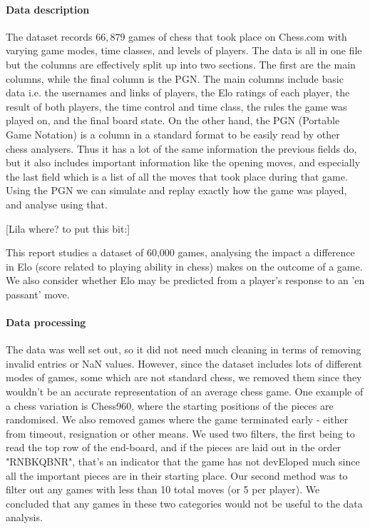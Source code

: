 \documentclass[10pt,a4paper,twocolumn]{article}
\begin{document}
\paragraph{Data description}
The dataset records $66,879$ games of chess that took place on Chess.com with varying game modes, time classes, and levels of players. The data is all in one file but the columns are effectively split up into two sections. The first are the main columns, while the final column is the PGN. The main columns include basic data i.e. the usernames and links of players, the Elo ratings of each player, the result of both players, the time control and time class, the rules the game was played on, and the final board state. On the other hand, the PGN (Portable Game Notation) is a column in a standard format to be easily read by other chess analysers. Thus it has a lot of the same information the previous fields do, but it also includes important information like the opening moves, and especially the last field which is a list of all the moves that took place during that game. Using the PGN we can simulate and replay exactly how the game was played, and analyse using that.

[Lila where? to put this bit:]

This report studies a dataset of 60,000 games, analysing the impact a difference in Elo (score related to playing ability in chess) makes on the outcome of a game. We also consider whether Elo may be predicted from a player's response to an 'en passant' move.

\paragraph{Data processing}
The data was well set out, so it did not need much cleaning in terms of removing invalid entries or NaN values. However, since the dataset includes lots of different modes of games, some which are not standard chess, we removed them since they wouldn't be an accurate representation of an average chess game. One example of a chess variation is Chess960, where the starting positions of the pieces are randomised.
We also removed games where the game terminated early - either from timeout, resignation or other means. We used two filters, the first being to read the top row of the end-board, and if the pieces are laid out in the order "RNBKQBNR", that's an indicator that the game has not devEloped much since all the important pieces are in their starting place. Our second method was to filter out any games with less than 10 total moves (or 5 per player). We concluded that any games in these two categories would not be useful to the data analysis.
\end{document}
